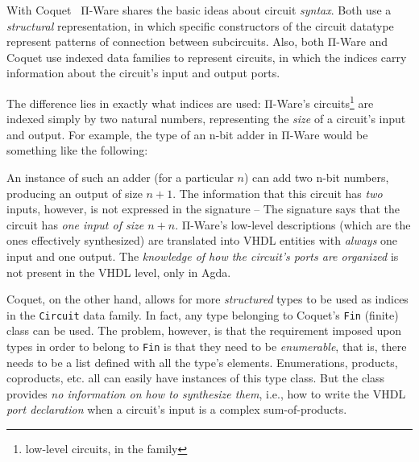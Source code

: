         With Coquet~\cite{coquet2011} Π-Ware shares the basic ideas about circuit \emph{syntax}.
        Both use a \emph{structural} representation, in which specific constructors of the circuit
        datatype represent patterns of connection between subcircuits.
        Also, both Π-Ware and Coquet use indexed data families to represent circuits, in which
        the indices carry information about the circuit's input and output ports.

        The difference lies in exactly what indices are used: Π-Ware's
        circuits\footnote{low-level circuits, in the  family}
        are indexed simply by two natural numbers, representing the \emph{size} of a circuit's input and output.
        For example, the type of an n-bit adder in Π-Ware would be something like the following:

        \begin{center}
             \AY{:}  \AY{(} \AF{+} \AY{)} \AY{(} \AY{)}
        \end{center}

        An instance of such an adder (for a particular $n$) can add two n-bit numbers, producing
        an output of size $n+1$. The information that this circuit has \emph{two} inputs, however,
        is not expressed in the signature – The signature says that the circuit has
        \emph{one input of size $n+n$}.
        Π-Ware's low-level descriptions (which are the ones effectively synthesized) are translated
        into \ac{VHDL} entities with \emph{always} one input and one output.
        The \emph{knowledge of how the circuit's ports are organized} is not present in the \ac{VHDL}
        level, only in Agda.

        Coquet, on the other hand, allows for more \emph{structured} types to be used as indices in
        the \texttt{Circuit} data family.
        In fact, any type belonging to Coquet's \texttt{Fin} (finite) class can be used.
        The problem, however, is that the requirement imposed upon types in order to belong to
        \texttt{Fin} is that they need to be \emph{enumerable}, that is, there needs to be a
        list defined with all the type's elements.
        Enumerations, products, coproducts, etc. all can easily have instances of this type class.
        But the class provides \emph{no information on how to synthesize them}, i.e.,
        how to write the \ac{VHDL} \emph{port declaration} when a circuit's input is a complex
        sum-of-products.

